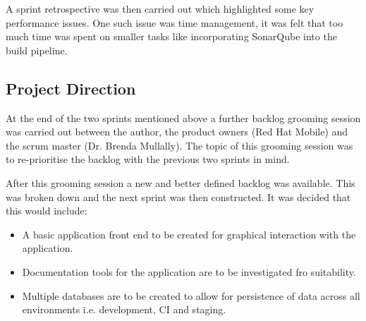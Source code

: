 A sprint retrospective was then carried out which highlighted some key performance issues. One such issue was time management, it was felt that too much time was spent on smaller tasks like incorporating SonarQube into the build pipeline.

\subsection{Project Direction}
At the end of the two sprints mentioned above a further backlog grooming session was carried out between the author, the product owners (Red Hat Mobile) and the scrum master (Dr. Brenda Mullally). The topic of this grooming session was to re-prioritise the backlog with the previous two sprints in mind.

After this grooming session a new and better defined backlog was available. This was broken down and the next sprint was then constructed. It was decided that this would include:

\begin{itemize}
	\item A basic application front end to be created for graphical interaction with the application.
	\item Documentation tools for the application are to be investigated fro suitability.
	\item Multiple databases are to be created to allow for persistence of data across all environments i.e. development, CI and staging.
\end{itemize}
